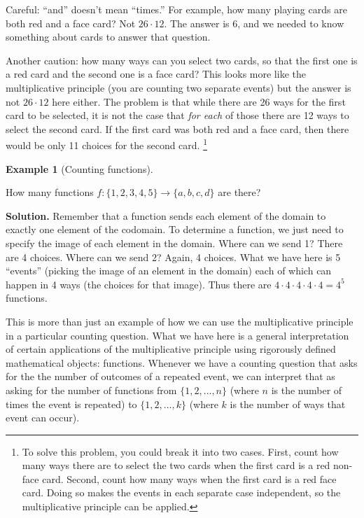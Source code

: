 \documentclass[10pt,]{book}
\theoremstyle{plain}
\theoremstyle{definition}
\newtheorem{example}[theorem]{Example}
\theoremstyle{definition}
\theoremstyle{definition}
\numberwithin{equation}{section}
\begin{document}
    Careful: ``and'' doesn't mean ``times.'' For example, how many playing cards are both red and a face card? Not \(26 \cdot 12\). The answer is 6, and we needed to know something about cards to answer that question.
\par

    Another caution: how many ways can you select two cards, so that the first one is a red card and the second one is a face card? This looks more like the multiplicative principle (you are counting two separate events) but the answer is not \(26 \cdot 12\) here either. The problem is that while there are 26 ways for the first card to be selected, it is not the case that \emph{for each} of those there are 12 ways to select the second card. If the first card was both red and a face card, then there would be only 11 choices for the second card.
    \footnote{To solve this problem, you could break it into two cases. First, count how many ways there are to select the two cards when the first card is a red non-face card. Second, count how many ways when the first card is a red face card. Doing so makes the events in each separate case independent, so the multiplicative principle can be applied.\label{fn-1}}
\begin{example}[Counting functions]\label{ex_counting-functions-all}

      How many functions \(f:\{1,2,3,4,5\} \to \{a,b,c,d\}\) are there?
    \par\medskip\noindent%
\textbf{Solution.}\quad 
        Remember that a function sends each element of the domain to exactly one element of the codomain.  To determine a function, we just need to specify the image of each element in the domain.  Where can we send 1?  There are 4 choices.  Where can we send 2?  Again, 4 choices.  What we have here is 5 ``events'' (picking the image of an element in the domain) each of which can happen in 4 ways (the choices for that image).  Thus there are \(4 \cdot 4 \cdot 4 \cdot 4 \cdot 4 = 4^5\) functions.
\par

        This is more than just an example of how we can use the multiplicative principle in a particular counting question.  What we have here is a general interpretation of certain applications of the multiplicative principle using rigorously defined mathematical objects: functions.  Whenever we have a counting question that asks for the the number of outcomes of a repeated event, we can interpret that as asking for the number of functions from \(\{1,2,\ldots, n\}\) (where \(n\) is the number of times the event is repeated) to  \(\{1,2,\ldots,k\}\) (where \(k\) is the number of ways that event can occur).
\end{example}
\typeout{************************************************}
\typeout{************************************************}
\end{document}
